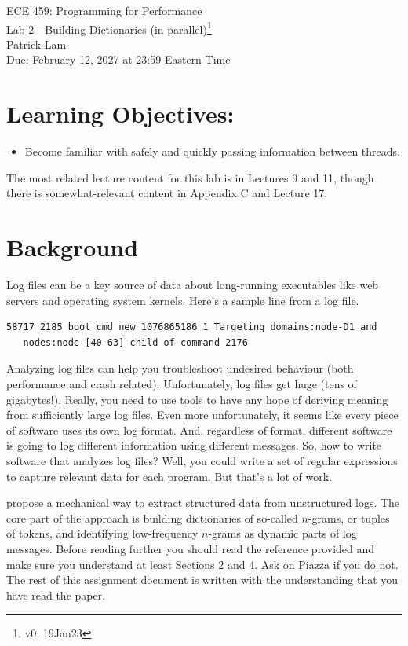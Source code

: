 \documentclass[12pt]{article}
\renewcommand{\_}{\kern-1.5pt\textunderscore\kern-1.5pt}
\begin{document}
\begin{center}
{\Large ECE 459: Programming for Performance}\\
{\Large Lab 2---Building Dictionaries (in parallel)\footnote{v0, 19Jan23}}\\[1em]
Patrick Lam\\
Due: February 12, 2027 at 23:59 Eastern Time
\end{center}

\section*{Learning Objectives:}

\begin{itemize}[noitemsep]
	\item Become familiar with safely and quickly passing information between threads.
\end{itemize}

The most related lecture content for this lab is in Lectures 9 and 11, though there is somewhat-relevant content in Appendix C and Lecture 17.

\section*{Background}
Log files can be a key source of data about long-running executables like web servers and operating system kernels. Here's a sample line from a log file.

\begin{verbatim}
58717 2185 boot_cmd new 1076865186 1 Targeting domains:node-D1 and
   nodes:node-[40-63] child of command 2176
\end{verbatim}

Analyzing log files can help you troubleshoot undesired behaviour (both performance and crash related). Unfortunately, log files get huge (tens of gigabytes!). Really, you need to use tools to have any hope of deriving meaning from sufficiently large log files. Even more unfortunately, it seems like every piece of software uses its own log format. And, regardless of format, different software is going to log different information using different messages. So, how to write software that analyzes log files? Well, you could write a set of regular expressions to capture relevant data for each program. But that's a lot of work.

\cite{dai22} propose a mechanical way to extract structured data from unstructured logs. The core part of the approach is building dictionaries of so-called $n$-grams, or tuples of tokens, and identifying low-frequency $n$-grams as dynamic parts of log messages. Before reading further you should read the reference provided and make sure you understand at least Sections 2 and 4. Ask on Piazza if you do not. The rest of this assignment document is written with the understanding that you have read the paper.
\end{document}
